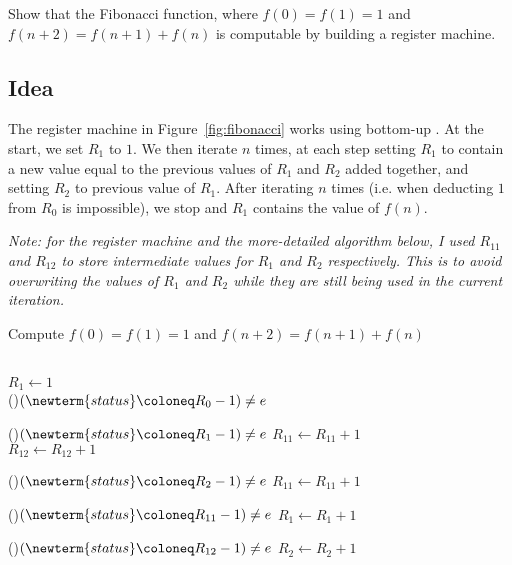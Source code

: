 \begin{problem}
  Show that the Fibonacci function, where $f(0) = f(1) = 1$
  and $f(n + 2) = f(n + 1) + f(n)$ is computable by building
  a register machine.

  \begin{answer}

    \subsection*{Idea}
    
    The register machine in Figure~\ref*{fig:fibonacci} works using
    bottom-up .
    At the start, we set $R_1$ to $1$. We then iterate $n$ times,
    at each step setting $R_1$ to contain a new value equal to the previous values
    of $R_1$ and $R_2$ added together, and setting $R_2$ to previous value of $R_1$.
    After iterating $n$ times (i.e. when deducting $1$ from $R_0$ is impossible),
    we stop and $R_1$ contains the value of $f(n)$.

    \step
    \emph{
      Note: for the register machine and the more-detailed algorithm below,
      I used $R_{11}$ and $R_{12}$ to store intermediate values
      for $R_1$ and $R_2$ respectively. This is to avoid overwriting
      the values of $R_1$ and $R_2$ while they are still being used in
      the current iteration.
    }
    
    \step
    \begin{algorithm}[H]
      \caption{Compute $f(0) = f(1) = 1$ and $f(n + 2) = f(n + 1) + f(n)$ }
         \\
        $R_1 \gets 1$ \\
        \While(){$(\newterm{status} \coloneq R_0 - 1) \neq e$}{
          
        \While(){$(\newterm{status} \coloneq R_1 - 1) \neq e$}{
            $R_{11} \gets R_{11} + 1$ \\
            $R_{12} \gets R_{12} + 1$
          }

          \While(){$(\newterm{status} \coloneq R_2 - 1) \neq e$}{
            $R_{11} \gets R_{11} + 1$
          }

          \While(){$(\newterm{status} \coloneq R_{11} - 1) \neq e$}{
            $R_1 \gets R_1 + 1$
          }

          \While(){$(\newterm{status} \coloneq R_{12} - 1) \neq e$}{
            $R_2 \gets R_2 + 1$
          }
        }
    \end{algorithm}


\end{answer}
\end{problem}
